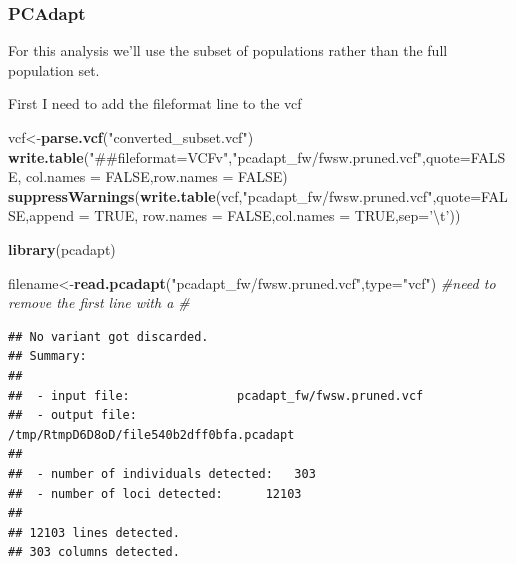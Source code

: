 \documentclass[]{article}
\newenvironment{Shaded}{\begin{snugshade}}{\end{snugshade}}
\newcommand{\KeywordTok}[1]{\textcolor[rgb]{0.13,0.29,0.53}{\textbf{#1}}}
\newcommand{\DataTypeTok}[1]{\textcolor[rgb]{0.13,0.29,0.53}{#1}}
\newcommand{\CharTok}[1]{\textcolor[rgb]{0.31,0.60,0.02}{#1}}
\newcommand{\StringTok}[1]{\textcolor[rgb]{0.31,0.60,0.02}{#1}}
\newcommand{\CommentTok}[1]{\textcolor[rgb]{0.56,0.35,0.01}{\textit{#1}}}
\newcommand{\OtherTok}[1]{\textcolor[rgb]{0.56,0.35,0.01}{#1}}
\newcommand{\NormalTok}[1]{#1}
\begin{document}
\subsubsection{PCAdapt}\label{pcadapt-1}

For this analysis we'll use the subset of populations rather than the
full population set.

First I need to add the fileformat line to the vcf

\begin{Shaded}
\begin{Highlighting}[]
\NormalTok{vcf<-}\KeywordTok{parse.vcf}\NormalTok{(}\StringTok{"converted_subset.vcf"}\NormalTok{)}
\KeywordTok{write.table}\NormalTok{(}\StringTok{"##fileformat=VCFv"}\NormalTok{,}\StringTok{"pcadapt_fw/fwsw.pruned.vcf"}\NormalTok{,}\DataTypeTok{quote=}\OtherTok{FALSE}\NormalTok{,}
            \DataTypeTok{col.names =} \OtherTok{FALSE}\NormalTok{,}\DataTypeTok{row.names =} \OtherTok{FALSE}\NormalTok{)}
\KeywordTok{suppressWarnings}\NormalTok{(}\KeywordTok{write.table}\NormalTok{(vcf,}\StringTok{"pcadapt_fw/fwsw.pruned.vcf"}\NormalTok{,}\DataTypeTok{quote=}\OtherTok{FALSE}\NormalTok{,}\DataTypeTok{append =} \OtherTok{TRUE}\NormalTok{,}
            \DataTypeTok{row.names =} \OtherTok{FALSE}\NormalTok{,}\DataTypeTok{col.names =} \OtherTok{TRUE}\NormalTok{,}\DataTypeTok{sep=}\StringTok{'}\CharTok{\textbackslash{}t}\StringTok{'}\NormalTok{))}
\end{Highlighting}
\end{Shaded}

\begin{Shaded}
\begin{Highlighting}[]
\KeywordTok{library}\NormalTok{(pcadapt)}

\NormalTok{filename<-}\KeywordTok{read.pcadapt}\NormalTok{(}\StringTok{"pcadapt_fw/fwsw.pruned.vcf"}\NormalTok{,}\DataTypeTok{type=}\StringTok{"vcf"}\NormalTok{) }\CommentTok{#need to remove the first line with a # }
\end{Highlighting}
\end{Shaded}

\begin{verbatim}
## No variant got discarded.
## Summary:
## 
##  - input file:               pcadapt_fw/fwsw.pruned.vcf
##  - output file:              /tmp/RtmpD6D8oD/file540b2dff0bfa.pcadapt
## 
##  - number of individuals detected:   303
##  - number of loci detected:      12103
## 
## 12103 lines detected.
## 303 columns detected.
\end{verbatim}
\end{document}
